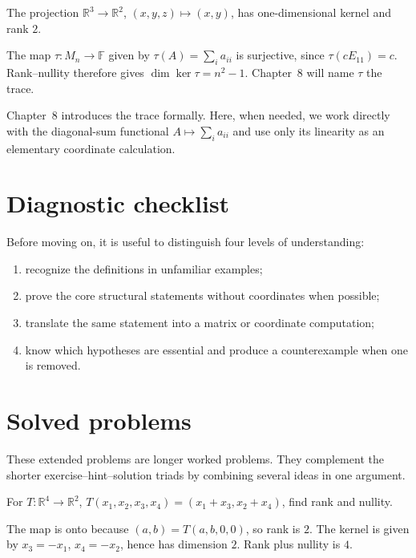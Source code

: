 \begin{example}[Projection]\label{ex:i06-worked-02}
The projection $\mathbb R^3\to\mathbb R^2$, $(x,y,z)\mapsto(x,y)$, has one-dimensional kernel and rank $2$.
\end{example}

\begin{example}\label{ex:i06-worked-03}
The map $\tau:M_n\to\mathbb F$ given by $\tau(A)=\sum_i a_{ii}$ is surjective, since $\tau(cE_{11})=c$. Rank--nullity therefore gives $\dim\ker\tau=n^2-1$. Chapter~8 will name $\tau$ the trace.
\end{example}

\begin{remark}
Chapter~8 introduces the trace formally. Here, when needed, we work directly
with the diagonal-sum functional \(A\mapsto\sum_i a_{ii}\) and use only its
linearity as an elementary coordinate calculation.
\end{remark}

\section{Diagnostic checklist}
Before moving on, it is useful to distinguish four levels of understanding:
\begin{enumerate}
\item recognize the definitions in unfamiliar examples;
\item prove the core structural statements without coordinates when possible;
\item translate the same statement into a matrix or coordinate computation;
\item know which hypotheses are essential and produce a counterexample when one is removed.
\end{enumerate}

\section{Solved problems}
These extended problems are longer worked problems. They complement the shorter exercise--hint--solution triads by combining several ideas in one argument.

\begin{problem}\label{prob:i06-problem-01}
For $T:\mathbb R^4\to\mathbb R^2$, $T(x_1,x_2,x_3,x_4)=(x_1+x_3,x_2+x_4)$, find rank and nullity.
\end{problem}
\begin{solution}
The map is onto because $(a,b)=T(a,b,0,0)$, so rank is $2$. The kernel is given by $x_3=-x_1$, $x_4=-x_2$, hence has dimension $2$. Rank plus nullity is $4$.
\end{solution}

